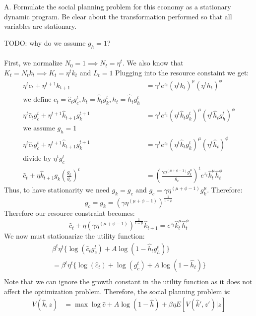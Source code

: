 \documentclass[answers]{exam}
\begin{document}
\begin{questions}
A. Formulate the social planning problem for this economy as a stationary dynamic program. Be clear about the transformation performed so that all variables are stationary.
\begin{solution} TODO: why do we assume $g_h = 1$?\\\\
    First, we normalize $N_0=1 \implies N_{t}= \eta^t$. We also know that $K_t = N_t k_t \implies K_t = \eta^t k_t$ and $L_t=1$ Plugging into the resource constaint we get:
    \begin{align*}
        \eta^t c_t + \eta^{t+1} k_{t+1} &= \gamma^t e^{z_t} (\eta^t k_t)^\mu (\eta^t h_t)^\phi\\
        \text{we define $c_t = \hat{c}_t g_c^t, k_t = \hat{k}_t g_k^t, h_t= \hat{h}_t g_h^t$}\\
        \eta^t \hat{c}_t g_c^t + \eta^{t+1} \hat{k}_{t+1} g_k^{t+1} &= \gamma^t e^{z_t} (\eta^t \hat{k}_t g_k^t)^\mu (\eta^t \hat{h}_t g_h^t)^\phi\\
        \text{we assume $g_h = 1$}\\
        \eta^t \hat{c}_t g_c^t + \eta^{t+1} \hat{k}_{t+1} g_k^{t+1} &= \gamma^t e^{z_t} (\eta^t \hat{k}_t g_k^t)^\mu (\eta^t \hat{h}_t)^\phi\\
        \text{divide by $\eta^t g_c^t$}\\
        \hat{c}_t + \eta \hat{k}_{t+1} g_k (\frac{g_k}{g_c})^t &= (\frac{\gamma \eta^{(\mu+\phi-1)} g_k^\mu}{g_c})^t e^{z_t} \hat{k}_t^\mu \hat{h}_t^\phi
    \end{align*}
    Thus, to have stationarity we need $g_k = g_c$ and $g_c = \gamma \eta^{(\mu+\phi-1)} g_k^\mu$. Therefore:
    $$g_c = g_k = (\gamma \eta^{(\mu+\phi-1)})^\frac{1}{1-\mu}$$
    Therefore our resource constraint becomes:
    $$\hat{c}_t + \eta  (\gamma \eta^{(\mu+\phi-1)})^\frac{1}{1-\mu} \hat{k}_{t+1} = e^{z_t} \hat{k}_t^\mu \hat{h}_t^\phi$$
    We now must stationarize the utility function:
    \begin{align*}
        \beta^t \eta^t \{\log(\hat{c}_t g_c^t) + A \log(1-\hat{h}_t g_h^t)\}\\
        = \beta^t \eta^t \{\log(\hat{c}_t) + \log(g_c^t) + A \log(1-\hat{h}_t)\}\\
    \end{align*}
    Note that we can ignore the growth constant in the utility function as it does not affect the optimization problem. Therefore, the social planning problem is:
    \begin{align*}
        V(\hat{k},z) &= \max_{} \log \hat{c} + A \log(1-\hat{h}) + \beta \eta E[V(\hat{k}',z')|z]\\

\end{align*}
\end{solution}
\end{questions}
\end{document}
